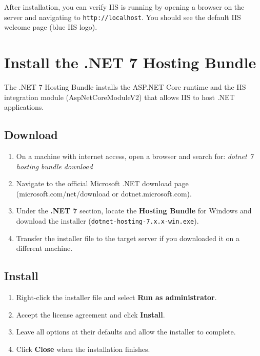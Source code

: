 \documentclass[12pt,a4paper]{report}
\begin{document}
\begin{notebox}
After installation, you can verify IIS is running by opening a browser on the server and navigating to \texttt{http://localhost}. You should see the default IIS welcome page (blue IIS logo).
\end{notebox}

\chapter{Install the .NET 7 Hosting Bundle}
\label{ch:hostingbundle}

The .NET 7 Hosting Bundle installs the ASP.NET Core runtime and the IIS integration module (AspNetCoreModuleV2) that allows IIS to host .NET applications.

\section{Download}
\begin{enumerate}
  \item On a machine with internet access, open a browser and search for: \emph{dotnet 7 hosting bundle download}
  \item Navigate to the official Microsoft .NET download page (microsoft.com/net/download or dotnet.microsoft.com).
  \item Under the \textbf{.NET 7} section, locate the \textbf{Hosting Bundle} for Windows and download the installer (\texttt{dotnet-hosting-7.x.x-win.exe}).
  \item Transfer the installer file to the target server if you downloaded it on a different machine.
\end{enumerate}

\section{Install}
\begin{enumerate}
  \item Right-click the installer file and select \textbf{Run as administrator}.
  \item Accept the license agreement and click \textbf{Install}.
  \item Leave all options at their defaults and allow the installer to complete.
  \item Click \textbf{Close} when the installation finishes.
\end{enumerate}
\end{document}
